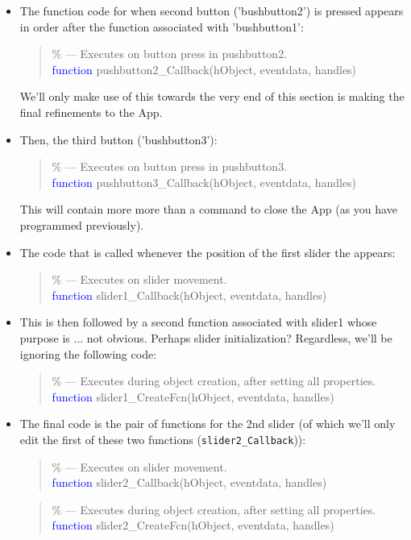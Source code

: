 \documentclass{tufte-book} %
\newenvironment{docspec}{\begin{quotation}\ttfamily\parskip0pt\parindent0pt\ignorespaces}{\end{quotation}}
\begin{document}
\begin{itemize}[noitemsep]
\item The function code for when second button ('\textsf{bushbutton2}') is pressed appears in order after the function associated with '\textsf{bushbutton1}':
\begin{docspec}
\textcolor[rgb]{0,0.501961,0}{\% --- Executes on button press in pushbutton2.}
\\\textcolor{blue}{function} pushbutton2\_Callback(hObject, eventdata, handles)
\end{docspec} 
We'll only make use of this towards the very end of this section is making the final refinements to the App.
\item Then, the third button ('\textsf{bushbutton3}'):
\begin{docspec}
\textcolor[rgb]{0,0.501961,0}{\% --- Executes on button press in pushbutton3.}
\\\textcolor{blue}{function} pushbutton3\_Callback(hObject, eventdata, handles)
\end{docspec} 
This will contain more more than a command to close the App (as you have programmed previously).
\item The code that is called whenever the position of the first slider the appears:
\begin{docspec}
\textcolor[rgb]{0,0.501961,0}{\% --- Executes on slider movement.}
\\\textcolor{blue}{function} slider1\_Callback(hObject, eventdata, handles)
\end{docspec} 
\item This is then followed by a second function associated with \textsf{slider1} whose purpose is ... not obvious. Perhaps slider initialization? Regardless, we'll be ignoring the following code:
\begin{docspec}
\textcolor[rgb]{0,0.501961,0}{\% --- Executes during object creation, after setting all properties.}
\\\textcolor{blue}{function} slider1\_CreateFcn(hObject, eventdata, handles)
\end{docspec} 
\item The final code is the pair of functions for the 2nd slider (of which we'll only edit the first of these two functions (\texttt{slider2\_Callback})):
\begin{docspec}
\textcolor[rgb]{0,0.501961,0}{\% --- Executes on slider movement.}
\\\textcolor{blue}{function} slider2\_Callback(hObject, eventdata, handles)
\end{docspec} 
\begin{docspec}
\textcolor[rgb]{0,0.501961,0}{\% --- Executes during object creation, after setting all properties.}
\\\textcolor{blue}{function} slider2\_CreateFcn(hObject, eventdata, handles)
\end{docspec} 
\end{itemize}
\end{document}
